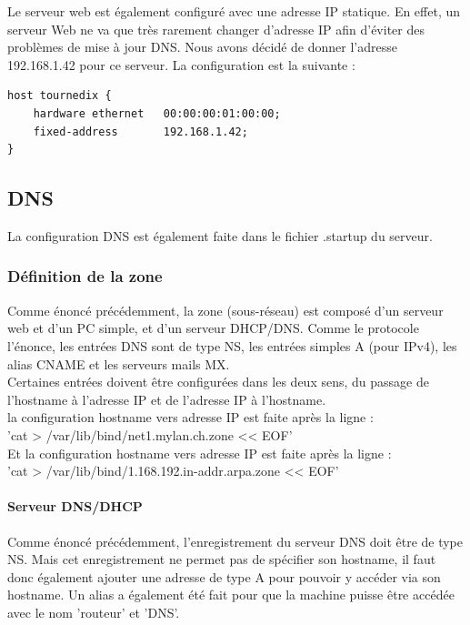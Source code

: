 \documentclass{article}
\begin{document}
Le serveur web est également configuré avec une adresse IP statique. En effet, un serveur Web ne va que très rarement changer d'adresse IP afin d'éviter des problèmes de mise à jour DNS. Nous avons décidé de donner l'adresse 192.168.1.42 pour ce serveur. La configuration est la suivante : \\

\begin{lstlisting}
host tournedix {
	hardware ethernet	00:00:00:01:00:00;
	fixed-address		192.168.1.42;
}
\end{lstlisting}

\subsection{DNS}
La configuration DNS est également faite dans le fichier .startup du serveur.

\subsubsection{Définition de la zone}
Comme énoncé précédemment, la zone (sous-réseau) est composé d'un serveur web et d'un PC simple, et d'un serveur DHCP/DNS. Comme le protocole l'énonce, les entrées DNS sont de type NS, les entrées simples A (pour IPv4), les alias CNAME et les serveurs mails MX. \cite{cours}\\

Certaines entrées doivent être configurées dans les deux sens, du passage de l'hostname à l'adresse IP et de l'adresse IP à l'hostname.\\

la configuration hostname vers adresse IP est faite après la ligne : \\
'cat > /var/lib/bind/net1.mylan.ch.zone << EOF' \\

Et la configuration hostname vers adresse IP est faite après la ligne :\\
 'cat > /var/lib/bind/1.168.192.in-addr.arpa.zone << EOF'

\paragraph{Serveur DNS/DHCP}

Comme énoncé précédemment, l'enregistrement du serveur DNS doit être de type NS. Mais cet enregistrement ne permet pas de spécifier son hostname, il faut donc également ajouter une adresse de type A pour pouvoir y accéder via son hostname. Un alias a également été fait pour que la machine puisse être accédée avec le nom 'routeur' et 'DNS'.\\
\end{document}
